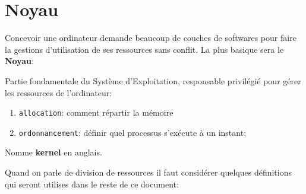 \documentclass{article}
\begin{document}
\section{Noyau}
Concevoir une ordinateur demande beaucoup de couches de softwares pour faire la gestions d'utilisation de ses ressources sans conflit. La plus basique sera le \textbf{Noyau}:
\begin{definition}\label{def:noyau}
    Partie fondamentale du Système d'Exploitation, responsable privilégié pour gérer les ressources de l'ordinateur:
    \begin{enumerate}[noitemsep]
        \item \texttt{allocation}: comment répartir la mémoire
        \item \texttt{ordonnancement}: définir quel processus s'exécute à un instant;
    \end{enumerate}
    
    \begin{remark}
        Nomme \textbf{kernel} en anglais.
    \end{remark}
\end{definition}
Quand on parle de division de ressources il faut considérer quelques définitions qui seront utilises dans le reste de ce document:
\end{document}
